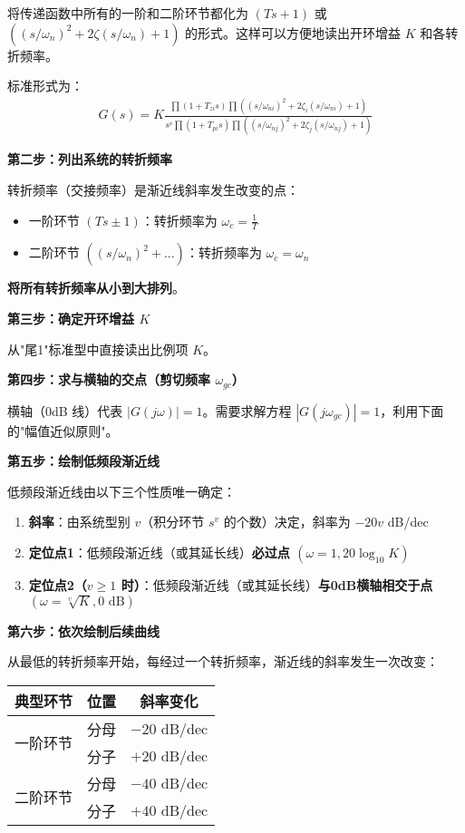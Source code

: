 将传递函数中所有的一阶和二阶环节都化为 $(Ts+1)$ 或 $((s/\omega_n)^2 + 2\zeta(s/\omega_n) + 1)$ 的形式。这样可以方便地读出开环增益 $K$ 和各转折频率。

标准形式为：
\begin{align*}
G(s) = K \frac{\prod(1+T_{zi}s)\prod((s/\omega_{ni})^2+2\zeta_i(s/\omega_{ni})+1)}{s^v\prod(1+T_{pi}s)\prod((s/\omega_{nj})^2+2\zeta_j(s/\omega_{nj})+1)}
\end{align*}

\textbf{第二步：列出系统的转折频率}

转折频率（交接频率）是渐近线斜率发生改变的点：
\begin{itemize}
    \item 一阶环节 $(Ts \pm 1)$：转折频率为 $\omega_c = \frac{1}{T}$
    \item 二阶环节 $((s/\omega_n)^2 + ...)$：转折频率为 $\omega_c = \omega_n$
\end{itemize}

\textbf{将所有转折频率从小到大排列}。

\textbf{第三步：确定开环增益 $K$}

从"尾1"标准型中直接读出比例项 $K$。

\textbf{第四步：求与横轴的交点（剪切频率 $\omega_{gc}$）}

横轴（0dB 线）代表 $|G(j\omega)| = 1$。需要求解方程 $|G(j\omega_{gc})| = 1$，利用下面的"幅值近似原则"。

\textbf{第五步：绘制低频段渐近线}

低频段渐近线由以下三个性质唯一确定：
\begin{enumerate}
    \item \textbf{斜率}：由系统型别 $v$（积分环节 $s^v$ 的个数）决定，斜率为 $-20v$ dB/dec
    \item \textbf{定位点1}：低频段渐近线（或其延长线）\textbf{必过点 $(\omega=1, 20\log_{10}K)$}
    \item \textbf{定位点2（$v \geq 1$ 时）}：低频段渐近线（或其延长线）\textbf{与0dB横轴相交于点 $(\omega = \sqrt[v]{K}, 0\text{ dB})$}
\end{enumerate}

\textbf{第六步：依次绘制后续曲线}

从最低的转折频率开始，每经过一个转折频率，渐近线的斜率发生一次改变：

\begin{center}
\begin{tabular}{|c|c|c|}
\hline
\textbf{典型环节} & \textbf{位置} & \textbf{斜率变化} \\
\hline
\multirow{2}{*}{一阶环节} & 分母 & $-20$ dB/dec \\
\cline{2-3}
& 分子 & $+20$ dB/dec \\
\hline
\multirow{2}{*}{二阶环节} & 分母 & $-40$ dB/dec \\
\cline{2-3}
& 分子 & $+40$ dB/dec \\
\hline
\end{tabular}
\end{center}

